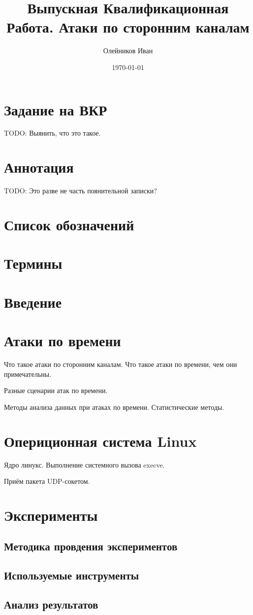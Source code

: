\documentclass[11pt,twoside,a4paper]{report}
\begin{document}
\title{Выпускная Квалификационная Работа. Атаки по сторонним каналам}
\author{Олейников Иван}
\date{\today}
\maketitle

\tableofcontents

\chapter*{Задание на ВКР}

TODO: Выянить, что это такое.

\chapter*{Аннотация}

TODO: Это разве не часть поянительной записки?

\chapter*{Список обозначений}

\chapter*{Термины}

\chapter*{Введение}

  

\chapter{Атаки по времени}

Что такое атаки по сторонним каналам. Что такое атаки по времени, чем они примечательны.

Разные сценарии атак по времени.

Методы анализа данных при атаках по времени. Статистические методы.

\chapter{Опериционная система Linux}

Ядро линукс. Выполнение системного вызова execve.

Приём пакета UDP-сокетом.

\chapter{Эксперименты}

\section{Методика провдения экспериментов}

\section{Используемые инструменты}

\section{Анализ результатов}
\end{document}
